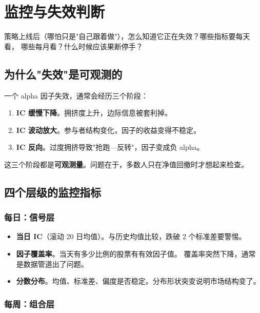 \chapter{监控与失效判断}\label{ch:monitor}

\begin{keybox}[本章要回答的问题]
策略上线后（哪怕只是"自己跟着做"），怎么知道它正在失效？哪些指标要每天看，
哪些每月看？什么时候应该果断停手？
\end{keybox}

\section{为什么"失效"是可观测的}

一个 alpha 因子失效，通常会经历三个阶段：

\begin{enumerate}
  \item \textbf{IC 缓慢下降}。拥挤度上升，边际信息被套利掉。
  \item \textbf{IC 波动放大}。参与者结构变化，因子的收益变得不稳定。
  \item \textbf{IC 反向}。过度拥挤导致"抢跑—反转"，因子变成负 alpha。
\end{enumerate}

这三个阶段都是\textbf{可观测量}。问题在于，多数人只在净值回撤时才想起来检查。

\section{四个层级的监控指标}

\subsection{每日：信号层}

\begin{itemize}
  \item \textbf{当日 IC}（滚动 20 日均值）。与历史均值比较，跌破 2 个标准差要警惕。
  \item \textbf{因子覆盖率}。当天有多少比例的股票有有效因子值。
        覆盖率突然下降，通常是数据管道出了问题。
  \item \textbf{分数分布}。均值、标准差、偏度是否稳定。分布形状突变说明市场结构变了。
\end{itemize}

\subsection{每周：组合层}

